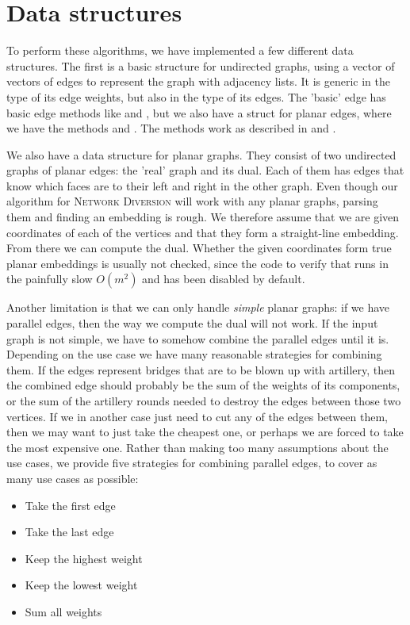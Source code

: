 \section{Data structures}
To perform these algorithms, we have implemented a few different data structures. The first is a basic structure for undirected graphs, using a vector of vectors of edges to represent the graph with adjacency lists. It is generic in the type of its edge weights, but also in the type of its edges. The 'basic' edge has basic edge methods like  and , but we also have a struct for planar edges, where we have the methods  and . The methods work as described in  and . 

We also have a data structure for planar graphs. They consist of two undirected graphs of planar edges: the 'real' graph and its dual. Each of them has edges that know which faces are to their left and right in the other graph. Even though our algorithm for \textsc{Network Diversion} will work with any planar graphs, parsing them and finding an embedding is rough. We therefore assume that we are given coordinates of each of the vertices and that they form a straight-line embedding. From there we can compute the dual. Whether the given coordinates form true planar embeddings is usually not checked, since the code to verify that runs in the painfully slow $O(m^2)$ and has been disabled by default.

Another limitation is that we can only handle \emph{simple} planar graphs: if we have parallel edges, then the way we compute the dual will not work. If the input graph is not simple, we have to somehow combine the parallel edges until it is. Depending on the use case we have many reasonable strategies for combining them. If the edges represent bridges that are to be blown up with artillery, then the combined edge should probably be the sum of the weights of its components, or the sum of the artillery rounds needed to destroy the edges between those two vertices. If we in another case just need to cut any of the edges between them, then we may want to just take the cheapest one, or perhaps we are forced to take the most expensive one. Rather than making too many assumptions about the use cases, we provide five strategies for combining parallel edges, to cover as many use cases as possible: 

\begin{itemize}
    \item Take the first edge
    \item Take the last edge
    \item Keep the highest weight
    \item Keep the lowest weight
    \item Sum all weights
\end{itemize}

